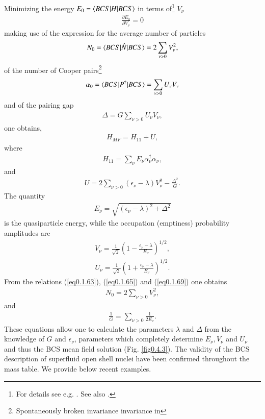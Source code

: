 Minimizing the energy $E_0=\langle {BCS|H|BCS} \rangle$ in terms of\footnote{For details see e.g. \cite{Ragnarsson:05}. See also \cite{Nathan:65}.} $V_\nu$
\begin{align}\label{eq0.1.62}
\frac{\partial E_0}{\partial V_\nu}=0
\end{align}
 making use of the expression for the average number of particles
\begin{align}\label{eq0.1.63}
N_0=\langle {BCS|\hat N|BCS} \rangle=2\sum_{\nu>0}V_\nu^2,
\end{align}
 of the number of Cooper pairs\footnote{Spontaneously broken invariance invariance in}
\begin{align}\label{eq0.1.64}
\alpha_0=\langle {BCS|P^\dagger|BCS} \rangle=\sum_{\nu>0}U_\nu V_\nu
\end{align}
and of the pairing gap
\begin{align}\label{eq0.1.65}
\Delta=G\sum_{\nu>0}U_\nu V_{\nu},
\end{align}
one obtains,
\begin{align}\label{eq0.1.66}
H_{MF}=H_{11}+U,
\end{align}
where 
\begin{align}\label{eq0.1.67}
H_{11}=\sum_\nu E_\nu \alpha^\dagger_\nu\alpha_\nu,
\end{align}
and
\begin{align}\label{eq0.1.68}
U=2\sum_{\nu>0}(\epsilon_\nu-\lambda)V^2_\nu-\frac{\Delta^2}{G}.
\end{align}
The quantity
\begin{align}\label{eq0.1.69}
E_\nu=\sqrt{(\epsilon_\nu-\lambda)^2+\Delta^2}
\end{align}
is the quasiparticle energy, while the occupation (emptiness) probability amplitudes are
\begin{align}\label{eq0.1.70}
V_\nu=\frac{1}{\sqrt{2}}\left(1-\frac{\epsilon_\nu-\lambda}{E_\nu}\right)^{1/2},
\end{align}
\begin{align}\label{eq0.1.71}
U_\nu=\frac{1}{\sqrt{2}}\left(1+\frac{\epsilon_\nu-\lambda}{E_\nu}\right)^{1/2}.
\end{align}
 From the relations (\ref{eq0.1.63}),  (\ref{eq0.1.65}) and (\ref{eq0.1.69}) one obtains
\begin{align}\label{eq0.1.72}
N_0=2\sum_{\nu>0}V^2_\nu,
\end{align}
 and 
\begin{align}\label{eq0.1.73}
\frac{1}{G}=\sum_{\nu>0}\frac{1}{2E_\nu}.
\end{align}
These equations allow one to calculate the parameters $\lambda$ and $\Delta$ from the knowledge of $G$ and $\epsilon_\nu$, parameters which completely determine $E_\nu,V_\nu$ and $U_\nu$ and thus the BCS mean field solution (Fig. \ref{fig0.4.3}).
The validity of the BCS description of superfluid open shell nuclei have been confirmed throughout the mass table. We provide below recent examples.

